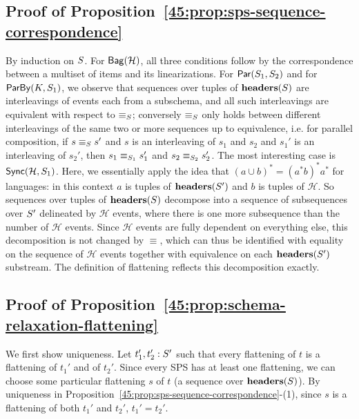 
\subsection*{Proof of Proposition~\ref{45:prop:sps-sequence-correspondence}}

By induction on $\ss$.
For $\relleaf{\mathcal{H}}$,
all three conditions follow by the correspondence between a multiset of items and its linearizations.
For $\parcomp{\ss_1}{\ss_2}$
and for $\keyby{K}{\ss_1}$,
we observe that sequences over tuples of $\headers(\ss)$ are interleavings of events each from a subschema,
and all such interleavings are equivalent with respect to $\equiv_{\ss}$;
conversely $\equiv_{\ss}$ only holds between different interleavings of the same two or more sequences up to equivalence, i.e. for parallel composition, if $s \equiv_{\ss} s'$ and $s$ is an interleaving of $s_1$ and $s_2$ and $s_1'$ is an interleaving of $s_2'$, then $s_1 \equiv_{\ss_1} s_1'$ and $s_2 \equiv_{\ss_2} s_2'$.
The most interesting case is $\hier{\mathcal{H}}{\ss_1}$.
Here, we essentially apply the idea that $(a \cup b)^{*} = (a^{*} b)^{*} a^{*}$ for languages: in this context $a$ is tuples of $\headers(\ss')$ and $b$ is tuples of $\mathcal{H}$.
So sequences over  tuples of $\headers(\ss)$ decompose into a sequence of subsequences over $\ss'$ delineated by $\mathcal{H}$ events, where there is one more subsequence than the number of $\mathcal{H}$ events.
Since $\mathcal{H}$ events are fully dependent on everything else, this decomposition is not changed by $\equiv$, which can thus be identified with equality on the sequence of $\mathcal{H}$ events together with equivalence on each $\headers(\ss')$ substream.
The definition of flattening reflects this decomposition exactly.

\subsection*{Proof of Proposition~\ref{45:prop:schema-relaxation-flattening}}

We first show uniqueness. Let $t_1', t_2': \ss'$
such that every flattening of $t$ is a flattening of $t_1'$ and of $t_2'$.
Since every SPS has at least one flattening,
we can choose some particular flattening $s$ of $t$
(a sequence over $\headers(\ss)$).
By uniqueness in Proposition~\ref{45:prop:sps-sequence-correspondence}-(1),
since $s$ is a flattening of both $t_1'$ and $t_2'$, $t_1' = t_2'$.

